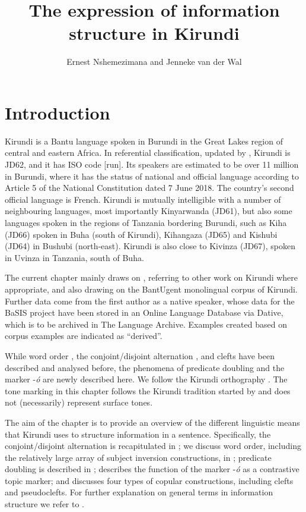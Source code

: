 \documentclass[output=paper]{langscibook}
\author{Ernest Nshemezimana\orcid{}\affiliation{Université de Burundi} and Jenneke van der Wal\orcid{}\affiliation{Leiden University}}
\title{The expression of information structure in Kirundi}
\begin{document}
\maketitle 
\label{ch:5}

\section{Introduction}
\begin{sloppypar}
Kirundi is a Bantu language spoken in Burundi in the Great Lakes region of central and eastern Africa. In  referential classification, updated by \citet{Maho2009}, Kirundi is JD62, and it has ISO code [run]. Its speakers are estimated to be over 11 million in Burundi, where it has the status of national and official language according to Article 5 of the National Constitution dated 7 June 2018. The country’s second official language is French. Kirundi is mutually intelligible with a number of neighbouring languages, most importantly Kinyarwanda (JD61), but also some languages spoken in the regions of Tanzania bordering Burundi, such as Kiha (JD66) spoken in Buha (south of Kirundi), Kihangaza (JD65) and Kishubi (JD64) in Bushubi (north-east). Kirundi is also close to Kivinza (JD67), spoken in Uvinza in Tanzania, south of Buha.
\end{sloppypar}

The current chapter mainly draws on \citet{Nshemezimana2016}, referring to other work on Kirundi where appropriate, and also drawing on the BantUgent monolingual corpus of Kirundi. Further data come from the first author as a native speaker, whose data for the BaSIS project have been stored in an Online Language Database via Dative, which is to be archived in The Language Archive. Examples created based on corpus examples are indicated as “derived”. 

While word order \citep{Morimoto1999,Morimoto2006,Bukuru2003}, the conjoint/disjoint alternation \citep{Ndayiragije1999,Sabimana1986,NshemezimanaBostoen2017}, and clefts \citep{LafkiouiEtAl2016} have been described and analysed before, the phenomena of predicate doubling and the marker -\textit{ó} are newly described here. We follow the Kirundi orthography \citep{Ntahokaja1994}. The tone marking in this chapter follows the Kirundi tradition started by \citet{Meeussen1959} and does not (necessarily) represent surface tones.

The aim of the chapter is to provide an overview of the different linguistic means that Kirundi uses to structure information in a sentence. Specifically, the conjoint/disjoint alternation is recapitulated in ; we discuss word order, including the relatively large array of subject inversion constructions, in ; predicate doubling is described in ;  describes the function of the marker -\textit{ó} as a contrastive topic marker; and  discusses four types of copular constructions, including clefts and pseudoclefts. For further explanation on general terms in information structure we refer to \textcite{chapters/intro}.
\end{document}
